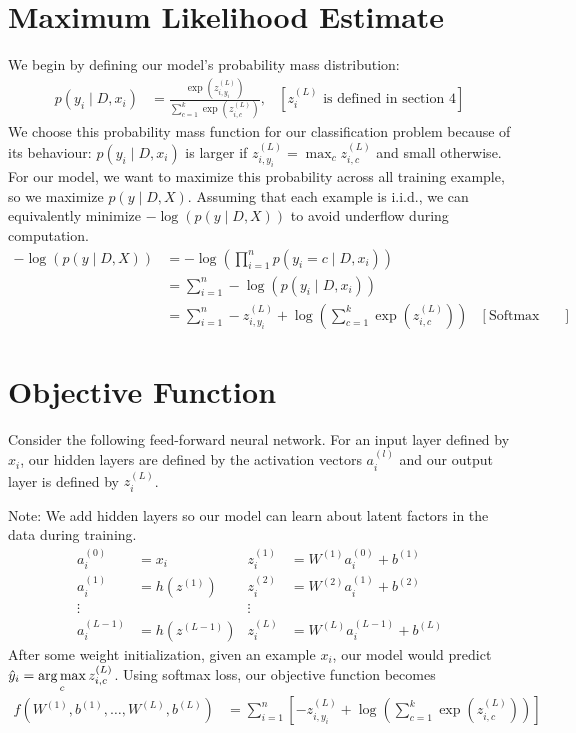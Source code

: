 \documentclass{article}
\def\argmax{\mathop{\rm arg\,max}}
\begin{document}
\section{Maximum Likelihood Estimate}
We begin by defining our model's probability mass distribution:
\begin{align*}
    p(y_i \mid D, x_i) &= \frac{\exp\left(z_{i,y_i}^{(L)}\right)}{\sum_{c=1}^k \exp\left(z_{i,c}^{(L)}\right)}, &\left[z_i^{(L)} \text{ is defined in section 4}\right] 
\end{align*}
We choose this probability mass function for our classification problem because of its behaviour: $p(y_i \mid D, x_i)$ is larger if $z_{i,y_i}^{(L)} = \max_{c} z_{i,c}^{(L)}$ and small otherwise. For our model, we want to maximize this probability across all training example, so we maximize $p(y \mid D, X)$. Assuming that each example is i.i.d., we can equivalently minimize $-\log(p(y \mid D, X))$ to avoid underflow during computation.
\begin{align*}    
    -\log(p(y \mid D, X)) &= -\log\left(\prod_{i=1}^n p(y_i = c \mid D, x_i)\right) \\
    &= \sum_{i=1}^n -\log(p(y_i \mid D, x_i)) \\
    &= \sum_{i=1}^n -z_{i, y_i}^{(L)} + \log\left(\sum_{c=1}^{k} \exp\left(z_{i, c}^{(L)}\right)\right) &[\text{Softmax Loss Function}]
\end{align*}



\newpage

\section{Objective Function}
Consider the following feed-forward neural network. For an input layer defined by $x_i$, our hidden layers are defined by the activation vectors $a_i^{(l)}$ and our output layer is defined by $z_i^{(L)}$. \vspace{1mm}

\noindent Note: We add hidden layers so our model can learn about latent factors in the data during training.
\begin{align*}
    a_i^{(0)} &= x_i & z_i^{(1)} &= W^{(1)}a_i^{(0)} + b^{(1)} \\
    a_i^{(1)} &= h\left(z^{(1)}\right) & z_i^{(2)} &= W^{(2)}a_i^{(1)} + b^{(2)} \\
    \vdots & & \vdots \\
    a_i^{(L-1)} &= h\left(z^{(L-1)}\right) & z_i^{(L)} &= W^{(L)}a_i^{(L-1)} + b^{(L)} 
\end{align*}
After some weight initialization, given an example $x_i$, our model would predict $\displaystyle\hat{y}_i = \argmax_{c} z_{i,c}^{(L)}$. Using softmax loss, our objective function becomes
\begin{align*}
    f(W^{(1)},b^{(1)},\dots,W^{(L)},b^{(L)}) &= \sum_{i=1}^{n} \left[-z_{i, y_i}^{(L)} + \log\left(\sum_{c=1}^{k} \exp\left(z_{i, c}^{(L)}\right)\right)\right]
\end{align*}
\end{document}
